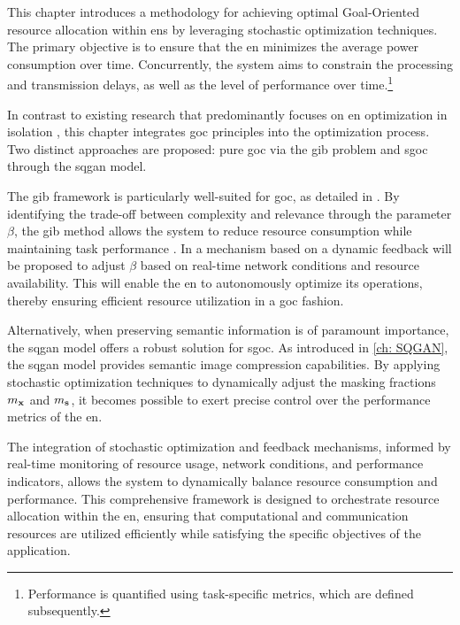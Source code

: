 This chapter introduces a methodology for achieving optimal Goal-Oriented resource allocation within \glspl{en} by leveraging stochastic optimization techniques. The primary objective is to ensure that the \gls{en} minimizes the average power consumption over time. Concurrently, the system aims to constrain the processing and transmission delays, as well as the level of performance over time.\footnote{Performance is quantified using task-specific metrics, which are defined subsequently.}

In contrast to existing research that predominantly focuses on \gls{en} optimization in isolation \cite{Mohammad2019Adaptive, Wang2018whenedge, Skatchkovsky2019optimizing, Merluzzi2020dynamic}, this chapter integrates \gls{goc} principles into the optimization process. Two distinct approaches are proposed: pure \gls{goc} via the \gls{gib} problem and \gls{sgoc} through the \gls{sqgan} model.

The \gls{gib} framework is particularly well-suited for \gls{goc}, as detailed in . By identifying the trade-off between complexity and relevance through the parameter $\beta$, the \gls{gib} method allows the system to reduce resource consumption while maintaining task performance \cite{Chechik2004GIB}. In  a mechanism based on a dynamic feedback will be proposed to adjust $\beta$ based on real-time network conditions and resource availability. This will enable the \gls{en} to autonomously optimize its operations, thereby ensuring efficient resource utilization in a \gls{goc} fashion.

Alternatively, when preserving semantic information is of paramount importance, the \gls{sqgan} model offers a robust solution for \gls{sgoc}. As introduced in \cref{ch: SQGAN}, the \gls{sqgan} model provides semantic image compression capabilities. By applying stochastic optimization techniques to dynamically adjust the masking fractions $m_{\mathbf{x}}$ and $m_{\mathbf{s}}$, it becomes possible to exert precise control over the performance metrics of the \gls{en}.

The integration of stochastic optimization and feedback mechanisms, informed by real-time monitoring of resource usage, network conditions, and performance indicators, allows the system to dynamically balance resource consumption and performance. This comprehensive framework is designed to orchestrate resource allocation within the \gls{en}, ensuring that computational and communication resources are utilized efficiently while satisfying the specific objectives of the application.

